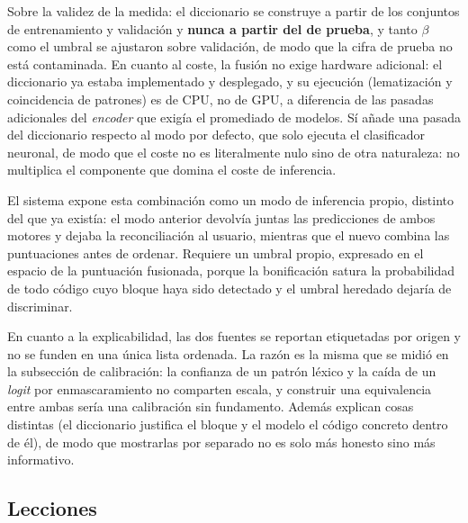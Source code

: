 Sobre la validez de la medida: el diccionario se construye a partir de los conjuntos de entrenamiento y validación y \textbf{nunca a partir del de prueba}, y tanto $\beta$ como el umbral se ajustaron sobre validación, de modo que la cifra de prueba no está contaminada. En cuanto al coste, la fusión no exige hardware adicional: el diccionario ya estaba implementado y desplegado, y su ejecución (lematización y coincidencia de patrones) es de CPU, no de GPU, a diferencia de las pasadas adicionales del \emph{encoder} que exigía el promediado de modelos. Sí añade una pasada del diccionario respecto al modo por defecto, que solo ejecuta el clasificador neuronal, de modo que el coste no es literalmente nulo sino de otra naturaleza: no multiplica el componente que domina el coste de inferencia.

El sistema expone esta combinación como un modo de inferencia propio, distinto del que ya existía: el modo anterior devolvía juntas las predicciones de ambos motores y dejaba la reconciliación al usuario, mientras que el nuevo combina las puntuaciones antes de ordenar. Requiere un umbral propio, expresado en el espacio de la puntuación fusionada, porque la bonificación satura la probabilidad de todo código cuyo bloque haya sido detectado y el umbral heredado dejaría de discriminar.

En cuanto a la explicabilidad, las dos fuentes se reportan etiquetadas por origen y no se funden en una única lista ordenada. La razón es la misma que se midió en la subsección de calibración: la confianza de un patrón léxico y la caída de un \emph{logit} por enmascaramiento no comparten escala, y construir una equivalencia entre ambas sería una calibración sin fundamento. Además explican cosas distintas (el diccionario justifica el bloque y el modelo el código concreto dentro de él), de modo que mostrarlas por separado no es solo más honesto sino más informativo.

\subsection{Lecciones}

